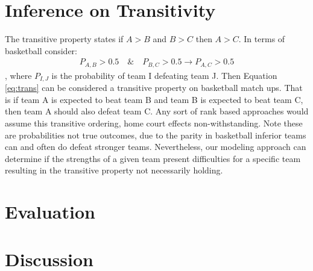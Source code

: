 \documentclass[11pt]{article} %
\begin{document}
\section{Inference on Transitivity}
The transitive property states if $A>B$ and $B>C$ then $A>C$.   In terms of basketball consider:
\begin{eqnarray}
P_{A,B} > 0.5 \quad \& \quad P_{B,C} > 0.5 \rightarrow P_{A,C} > 0.5
\label{eq:trans}
\end{eqnarray}
, where $P_{I,J}$ is the probability of team I defeating team J.  Then Equation \ref{eq:trans} can be considered a transitive property on basketball match ups.  That is if team A is expected to beat team B and team B is expected to beat team C, then team A should also defeat team C.  Any sort of rank based approaches would assume this transitive ordering, home court effects non-withstanding.  Note these are probabilities not true outcomes, due to the parity in basketball inferior teams can and often do defeat stronger teams.  Nevertheless, our modeling approach can determine if the strengths of a given team present difficulties for a specific team resulting in the transitive property not necessarily holding.

\section{Evaluation}

\section{Discussion}
\end{document}
